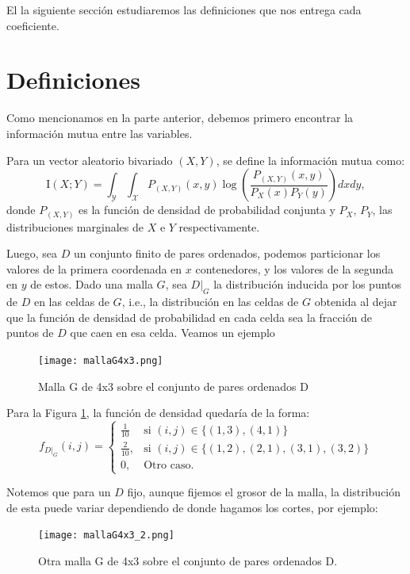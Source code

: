 	El la siguiente secci\'on estudiaremos las definiciones que nos entrega cada coeficiente.
 
\section{Definiciones}

	Como mencionamos en la parte anterior, debemos primero encontrar la informaci\'on mutua entre las variables.

	\begin{defn}
		Para un vector aleatorio bivariado $(X,Y)$, se define la informaci\'on mutua como:
		$$
		\mathrm{I}(X ; Y)=\int_{\mathcal{Y}} \int_{\mathcal{X}} P_{(X, Y)}(x, y) \log \left(\frac{P_{(X, Y)}(x, y)}{P_{X}(x) P_{Y}(y)}\right)dxdy,
		$$
		donde $P_{(X, Y)}$ es la funci\'on de densidad de probabilidad conjunta y $P_{X}$, $P_{Y}$, las distribuciones marginales de $X$ e $Y$ respectivamente. 
	\end{defn}

	Luego, sea $D$ un conjunto finito de pares ordenados, podemos particionar los valores de la primera coordenada en $x$ contenedores, y los valores de la segunda en $y$ de estos. Dado una malla $G$, sea $D|_G$ la distribuci\'on inducida por los puntos de $D$ en las celdas de $G$, i.e., la distribuci\'on en las celdas de $G$ obtenida al dejar que la funci\'on de densidad de probabilidad en cada celda sea la fracci\'on de puntos de $D$ que caen en esa celda. Veamos un ejemplo
	\begin{figure}[H]
		\centering
		\texttt{[image: mallaG4x3.png]}
		\caption{Malla G de 4x3 sobre el conjunto de pares ordenados D}
		\label{mallaG}
	\end{figure}

	Para la Figura \ref{mallaG}, la funci\'on de densidad quedar\'ia de la forma:
	\[
		f_{D|_G}(i,j) = \left\{\begin{array}{lr}
			\frac{1}{10} & \text{si } (i,j) \in \{ (1,3), (4,1)\} \\
			\frac{2}{10}, & \text{si }(i,j) \in \{ (1,2), (2,1), (3,1),(3,2)\}  \\
			0, & \text{Otro caso.}
			\end{array}\right.
	\]



	Notemos que para un $D$ fijo, aunque fijemos el grosor de la malla, la distribuci\'on de esta puede variar dependiendo de donde hagamos los cortes, por ejemplo:

	\begin{figure}[H] 
		\centering
		\texttt{[image: mallaG4x3\_2.png]}
		\caption{Otra malla G de 4x3 sobre el conjunto de pares ordenados D.}
		\label{malla_G_2}
	\end{figure}

